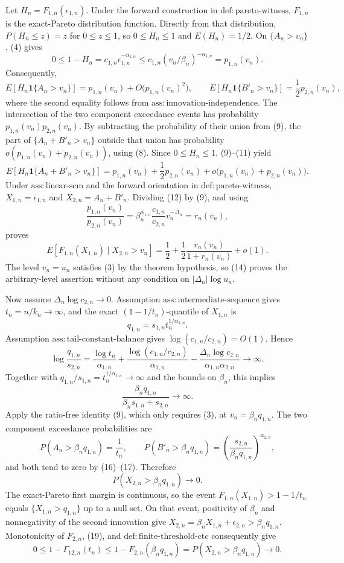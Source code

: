 Let \(H_n=F_{1,n}(\epsilon_{1,n})\). Under the forward construction in \(\mathrm{def{:}pareto\text{-}witness}\), \(F_{1,n}\) is the exact-Pareto distribution function. Directly from that distribution, \(P(H_n\leq z)=z\) for \(0\leq z\leq1\), so \(0\leq H_n\leq1\) and \(E(H_n)=1/2\). On \(\{A_n>v_n\}\), (4) gives
\[
0\leq1-H_n
=c_{1,n}\epsilon_{1,n}^{-\alpha_{1,n}}
\leq c_{1,n}(v_n/\beta_n)^{-\alpha_{1,n}}
=p_{1,n}(v_n).
\tag{10}
\]
Consequently,
\[
E[H_n\mathbf 1\{A_n>v_n\}]
=p_{1,n}(v_n)+O\bigl(p_{1,n}(v_n)^2\bigr),
\qquad
E[H_n\mathbf 1\{B'_n>v_n\}]
=\frac12p_{2,n}(v_n),
\tag{11}
\]
where the second equality follows from \(\mathrm{ass{:}innovation\text{-}independence}\). The intersection of the two component exceedance events has probability \(p_{1,n}(v_n)p_{2,n}(v_n)\). By subtracting the probability of their union from (9), the part of \(\{A_n+B'_n>v_n\}\) outside that union has probability \(o(p_{1,n}(v_n)+p_{2,n}(v_n))\), using (8). Since \(0\leq H_n\leq1\), (9)--(11) yield
\[
E[H_n\mathbf 1\{A_n+B'_n>v_n\}]
=p_{1,n}(v_n)+\frac12p_{2,n}(v_n)
+o\bigl(p_{1,n}(v_n)+p_{2,n}(v_n)\bigr).
\tag{12}
\]
Under \(\mathrm{ass{:}linear\text{-}scm}\) and the forward orientation in \(\mathrm{def{:}pareto\text{-}witness}\), \(X_{1,n}=\epsilon_{1,n}\) and \(X_{2,n}=A_n+B'_n\). Dividing (12) by (9), and using
\[
\frac{p_{1,n}(v_n)}{p_{2,n}(v_n)}
=\beta_n^{\alpha_{1,n}}\frac{c_{1,n}}{c_{2,n}}v_n^{-\Delta_n}
=r_n(v_n),
\tag{13}
\]
proves
\[
E[F_{1,n}(X_{1,n})\mid X_{2,n}>v_n]
=\frac12+\frac12\frac{r_n(v_n)}{1+r_n(v_n)}+o(1).
\tag{14}
\]
The level \(v_n=u_n\) satisfies (3) by the theorem hypothesis, so (14) proves the arbitrary-level assertion without any condition on \(|\Delta_n|\log u_n\).

Now assume \(\Delta_n\log c_{2,n}\to0\). Assumption \(\mathrm{ass{:}intermediate\text{-}sequence}\) gives \(t_n=n/k_n\to\infty\), and the exact \((1-1/t_n)\)-quantile of \(X_{1,n}\) is
\[
q_{1,n}=s_{1,n}t_n^{1/\alpha_{1,n}}.
\tag{15}
\]
Assumption \(\mathrm{ass{:}tail\text{-}constant\text{-}balance}\) gives \(\log(c_{1,n}/c_{2,n})=O(1)\). Hence
\[
\log\frac{q_{1,n}}{s_{2,n}}
=\frac{\log t_n}{\alpha_{1,n}}
+\frac{\log(c_{1,n}/c_{2,n})}{\alpha_{1,n}}
-\frac{\Delta_n\log c_{2,n}}{\alpha_{1,n}\alpha_{2,n}}
\longrightarrow\infty.
\tag{16}
\]
Together with \(q_{1,n}/s_{1,n}=t_n^{1/\alpha_{1,n}}\to\infty\) and the bounds on \(\beta_n\), this implies
\[
\frac{\beta_nq_{1,n}}{\beta_ns_{1,n}+s_{2,n}}\to\infty.
\tag{17}
\]
Apply the ratio-free identity (9), which only requires (3), at \(v_n=\beta_nq_{1,n}\). The two component exceedance probabilities are
\[
P(A_n>\beta_nq_{1,n})=\frac1{t_n},
\qquad
P(B'_n>\beta_nq_{1,n})
=\left(\frac{s_{2,n}}{\beta_nq_{1,n}}\right)^{\alpha_{2,n}},
\tag{18}
\]
and both tend to zero by (16)--(17). Therefore
\[
P(X_{2,n}>\beta_nq_{1,n})\to0.
\tag{19}
\]
The exact-Pareto first margin is continuous, so the event \(F_{1,n}(X_{1,n})>1-1/t_n\) equals \(\{X_{1,n}>q_{1,n}\}\) up to a null set. On that event, positivity of \(\beta_n\) and nonnegativity of the second innovation give \(X_{2,n}=\beta_nX_{1,n}+\epsilon_{2,n}>\beta_nq_{1,n}\). Monotonicity of \(F_{2,n}\), (19), and \(\mathrm{def{:}finite\text{-}threshold\text{-}ctc}\) consequently give
\[
0\leq1-\Gamma_{12,n}(t_n)
\leq1-F_{2,n}(\beta_nq_{1,n})
=P(X_{2,n}>\beta_nq_{1,n})\to0.
\tag{20}
\]

